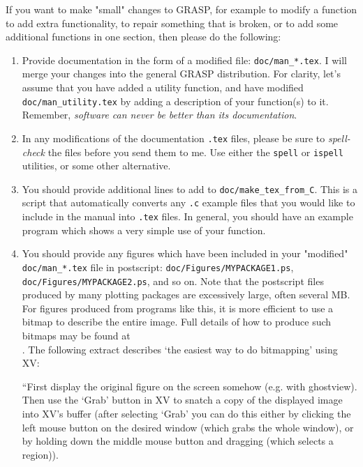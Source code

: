 If you want to make "small" changes to GRASP, for example to modify a function to add
extra functionality, to repair something that is broken, or to add some additional
functions in one section, then please do the following:
\begin{enumerate}
\item
Provide documentation in the form of a modified file:
    {\tt doc/man\_*.tex}.  I will merge your changes into the general GRASP
    distribution.  For clarity, let's assume that you have added a
    utility function, and have modified {\tt doc/man\_utility.tex} by adding
    a description of your function(s) to it.  Remember, {\it software can never
    be better than its documentation}.
\item
In any modifications of the documentation {\tt *.tex} files, please be sure to
{\it spell-check} the files before you send them to me.  Use either the {\tt spell}
or {\tt ispell} utilities, or some other alternative.
\item
 You should provide additional lines to add to {\tt doc/make\_tex\_from\_C}.
    This is a script that automatically converts any {\tt *.c} example files
    that you would like to include in the manual into {\tt .tex} files.  In
    general, you should have an example program which shows a very
    simple use of your function.
\item
You should provide any figures which have been included in your
    "modified" {\tt doc/man\_*.tex} file in postscript:
    {\tt doc/Figures/MYPACKAGE1.ps}, {\tt doc/Figures/MYPACKAGE2.ps}, and so on.
Note that the postscript files produced by many plotting packages are 
excessively large, often several MB.   For figures produced from
programs like this, it is more efficient to use a bitmap to describe the entire image. 
Full details of how to produce such bitmaps may be found at\\
.
The following extract describes `the easiest way to do bitmapping'
using XV: 

``First display the original figure on the screen somehow (e.g. with
ghostview). Then use the `Grab' button in XV to snatch a copy of the
displayed image into XV's buffer (after selecting `Grab' you can do
this either by clicking the left mouse button on the desired window
(which grabs the whole window), or by holding down the middle mouse
button and dragging (which selects a region)).


\end{enumerate}
